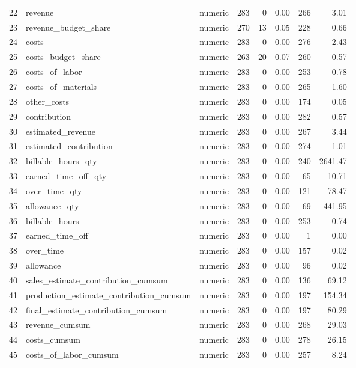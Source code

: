 \begin{sidewaystable}[ht]
\begin{tabular}{rllrrrrr}
  22 & revenue & numeric & 283 &   0 & 0.00 & 266 & 3.01 \\ 
  23 & revenue\_budget\_share & numeric & 270 &  13 & 0.05 & 228 & 0.66 \\ 
  24 & costs & numeric & 283 &   0 & 0.00 & 276 & 2.43 \\ 
  25 & costs\_budget\_share & numeric & 263 &  20 & 0.07 & 260 & 0.57 \\ 
  26 & costs\_of\_labor & numeric & 283 &   0 & 0.00 & 253 & 0.78 \\ 
  27 & costs\_of\_materials & numeric & 283 &   0 & 0.00 & 265 & 1.60 \\ 
  28 & other\_costs & numeric & 283 &   0 & 0.00 & 174 & 0.05 \\ 
  29 & contribution & numeric & 283 &   0 & 0.00 & 282 & 0.57 \\ 
  30 & estimated\_revenue & numeric & 283 &   0 & 0.00 & 267 & 3.44 \\ 
  31 & estimated\_contribution & numeric & 283 &   0 & 0.00 & 274 & 1.01 \\ 
  32 & billable\_hours\_qty & numeric & 283 &   0 & 0.00 & 240 & 2641.47 \\ 
  33 & earned\_time\_off\_qty & numeric & 283 &   0 & 0.00 &  65 & 10.71 \\ 
  34 & over\_time\_qty & numeric & 283 &   0 & 0.00 & 121 & 78.47 \\ 
  35 & allowance\_qty & numeric & 283 &   0 & 0.00 &  69 & 441.95 \\ 
  36 & billable\_hours & numeric & 283 &   0 & 0.00 & 253 & 0.74 \\ 
  37 & earned\_time\_off & numeric & 283 &   0 & 0.00 &   1 & 0.00 \\ 
  38 & over\_time & numeric & 283 &   0 & 0.00 & 157 & 0.02 \\ 
  39 & allowance & numeric & 283 &   0 & 0.00 &  96 & 0.02 \\ 
  40 & sales\_estimate\_contribution\_cumsum & numeric & 283 &   0 & 0.00 & 136 & 69.12 \\ 
  41 & production\_estimate\_contribution\_cumsum & numeric & 283 &   0 & 0.00 & 197 & 154.34 \\ 
  42 & final\_estimate\_contribution\_cumsum & numeric & 283 &   0 & 0.00 & 197 & 80.29 \\ 
  43 & revenue\_cumsum & numeric & 283 &   0 & 0.00 & 268 & 29.03 \\ 
  44 & costs\_cumsum & numeric & 283 &   0 & 0.00 & 278 & 26.15 \\ 
  45 & costs\_of\_labor\_cumsum & numeric & 283 &   0 & 0.00 & 257 & 8.24 \\ 

\end{tabular}
\end{sidewaystable}
